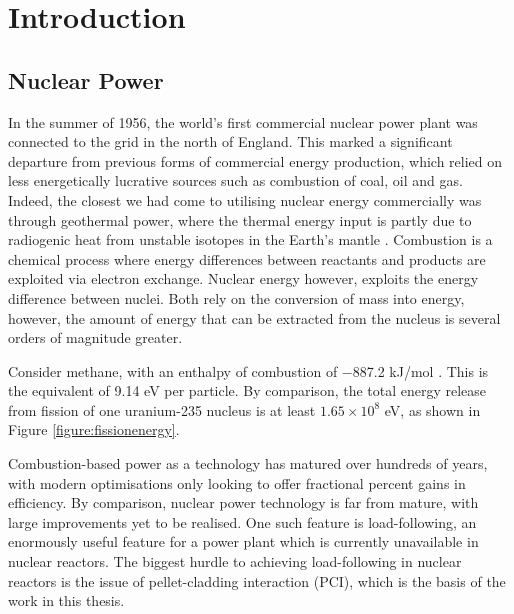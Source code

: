 \chapter{Introduction}

\section{Nuclear Power} %

In the summer of 1956, the world's first commercial nuclear power plant was connected to the grid in the north of England. This marked a significant departure from previous forms of commercial energy production, which relied on less energetically lucrative sources such as combustion of coal, oil and gas. Indeed, the closest we had come to utilising nuclear energy commercially was through geothermal power, where the thermal energy input is partly due to radiogenic heat from unstable isotopes in the Earth's mantle \cite{gando2011partial} . 
Combustion is a chemical process where energy differences between reactants and products are exploited via electron exchange. Nuclear energy however, exploits the energy difference between nuclei. Both rely on the conversion of mass into energy, however, the amount of energy that can be extracted from the nucleus is several orders of magnitude greater.

Consider methane, with an enthalpy of combustion of −887.2 kJ/mol \cite{thornton1917xv}. This is the equivalent of 9.14 eV per particle. By comparison, the total energy release from fission of one uranium-235 nucleus is at least $1.65 \times 10^{8}$ eV, as shown in Figure \ref{figure:fissionenergy}.

Combustion-based power as a technology has matured over hundreds of years, with modern optimisations only looking to offer fractional percent gains in efficiency. By comparison, nuclear power technology is far from mature, with large improvements yet to be realised. One such feature is load-following, an enormously useful feature for a power plant which is currently unavailable in nuclear reactors. The biggest hurdle to achieving load-following in nuclear reactors is the issue of pellet-cladding interaction (PCI), which is the basis of the work in this thesis.

